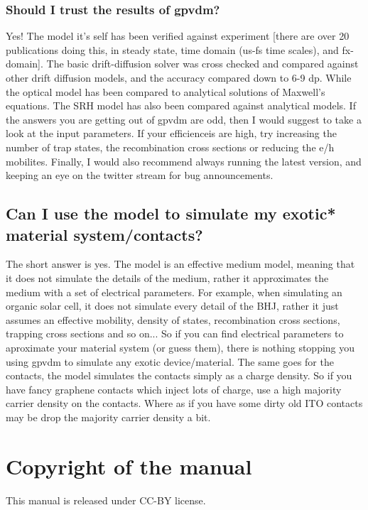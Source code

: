 \subsubsection{Should I trust the results of gpvdm?}
Yes!  The model it's self has been verified against experiment [there are over 20 publications doing this, in steady state, time domain (us-fs time scales), and fx-domain]. The basic drift-diffusion solver was cross checked and compared against other drift diffusion models, and the accuracy compared down to 6-9 dp.  While the optical model has been compared to analytical solutions of Maxwell's equations.  The SRH model has also been compared against analytical models.  If the answers you are getting out of gpvdm are odd, then I would suggest to take a look at the input parameters.  If your efficienceis are high, try increasing the number of trap states, the recombination cross sections or reducing the e/h mobilites.  Finally, I would also recommend always running the latest version, and keeping an eye on the twitter stream for bug announcements.



\subsection{Can I use the model to simulate my exotic* material system/contacts?}
The short answer is yes.  The model is an effective medium model, meaning that it does not simulate the details of the medium, rather it approximates the medium with a set of electrical parameters.  For example, when simulating an organic solar cell, it does not simulate every detail of the BHJ, rather it just assumes an effective mobility, density of states, recombination cross sections, trapping cross sections and so on...  So if you can find electrical parameters to aproximate your material system (or guess them), there is nothing stopping you using gpvdm to simulate any exotic device/material.  The same goes for the contacts, the model simulates the contacts simply as a charge density. So if you have fancy graphene contacts which inject lots of charge, use a high majority carrier density on the contacts.  Where as if you have some dirty old ITO contacts may be drop the majority carrier density a bit.

\newpage






\newpage
\section{Copyright of the manual}
This manual is released under CC-BY license.

